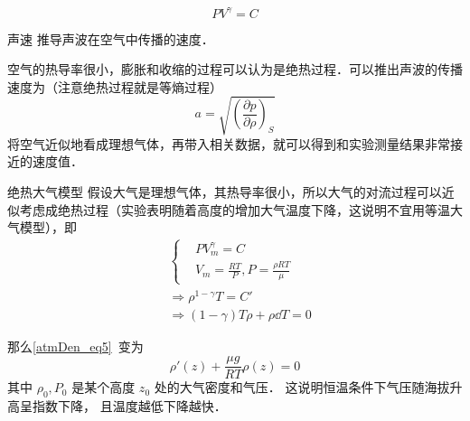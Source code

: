 \begin{equation}
P V^\gamma = C
\end{equation}

\begin{example}{声速}
推导声波在空气中传播的速度．

空气的热导率很小，膨胀和收缩的过程可以认为是绝热过程．可以推出声波的传播速度为（注意绝热过程就是等熵过程）
\begin{equation}
a=\sqrt{\left(\frac{\partial p}{\partial \rho}\right)_S}
\end{equation}
将空气近似地看成理想气体，再带入相关数据，就可以得到和实验测量结果非常接近的速度值．
\end{example}
\begin{example}{绝热大气模型}
假设大气是理想气体，其热导率很小，所以大气的对流过程可以近似考虑成绝热过程（实验表明随着高度的增加大气温度下降，这说明不宜用等温大气模型），即
\begin{equation}
\begin{aligned}
&\begin{cases}
&PV_m^\gamma=C\\
&V_m=\frac{RT}{P},P=\frac{\rho R T}{\mu}
\end{cases}
\\
&\Rightarrow \rho^{1-\gamma}T=C'\\
&\Rightarrow (1-\gamma)T\rho+\rho\dd T=0  
\end{aligned}
\end{equation}

那么\autoref{atmDen_eq5}~变为
\begin{equation}
\rho'(z)  +  \frac{\mu g}{RT}\rho(z) = 0
\end{equation}
其中 $\rho_0, P_0$ 是某个高度 $z_0$ 处的大气密度和气压． 这说明恒温条件下气压随海拔升高呈指数下降， 且温度越低下降越快．
\end{example}
